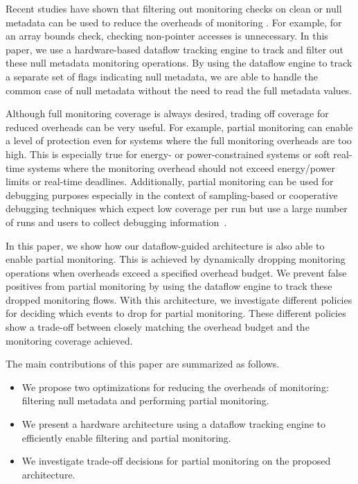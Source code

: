 Recent studies have shown that filtering out monitoring checks on clean or null
metadata can be used to reduce the overheads of monitoring \cite{fade-hpca14}.
For example, for
an array bounds check, checking non-pointer accesses is unnecessary. 
In this paper, we use a hardware-based dataflow tracking engine to track and
filter out these null metadata monitoring operations.
By using the dataflow engine to track a separate set of flags
indicating null metadata, we are able to handle the common case of null
metadata without the need to read the full metadata values.

Although full monitoring coverage is always desired, trading off coverage for
reduced overheads can be very useful. For example, partial
monitoring can enable a level of protection even for systems where the full
monitoring overheads are too high. This is especially true for energy- or
power-constrained systems or soft real-time systems where the monitoring
overhead should not exceed energy/power limits or real-time deadlines.
Additionally, partial monitoring can be used for debugging purposes
especially in the context of sampling-based or cooperative debugging techniques
which expect low coverage per run but use a large number of runs and users to
collect debugging information~\cite{liblit-pldi05, chilimbi-asplos04,
greathouse-cgo11}. 

In this paper, we show how our dataflow-guided architecture is also able to
enable partial monitoring. This is achieved by dynamically dropping monitoring
operations when overheads exceed a specified overhead budget. We prevent false
positives from partial monitoring by using the dataflow engine to track these
dropped monitoring flows. With this architecture, we investigate different
policies for deciding which events to drop for partial monitoring. These
different policies show a trade-off between closely matching the overhead
budget and the monitoring coverage achieved.

The main contributions of this paper are summarized as follows.
\begin{itemize}
  \item We propose two optimizations for reducing the overheads of monitoring: filtering null metadata and performing partial monitoring.
  \item We present a hardware architecture using a dataflow tracking engine to efficiently enable filtering and partial monitoring.
  \item We investigate trade-off decisions for partial monitoring on the proposed architecture.
\end{itemize}

